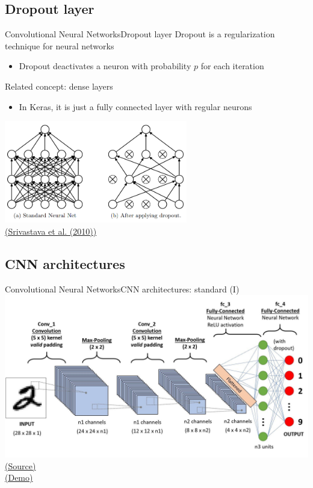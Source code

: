 \documentclass[10pt,compress]{beamer} %
\begin{document}
\subsection{Dropout layer}
\begin{frame}{Convolutional Neural Networks}{Dropout layer}
	\alert{Dropout} is a regularization technique for neural networks
	\begin{itemize}
		\item Dropout deactivates a neuron with probability $p$ for each iteration
	\end{itemize}

	Related concept: \alert{dense layers}
	\begin{itemize}
		\item In Keras, it is just a fully connected layer with regular neurons
	\end{itemize}
	\centering
        \includegraphics[width=0.6\textwidth]{figs/dropout.png}\\
	\scriptsize\href{https://jmlr.org/papers/volume15/srivastava14a.old/srivastava14a.pdf}{(Srivastava et al. (2010))}
\end{frame}

\subsection{CNN architectures}
\begin{frame}{Convolutional Neural Networks}{CNN architectures: standard (I)}
	\centering
        \includegraphics[width=\textwidth]{figs/layers.png}\\
	    \scriptsize\href{https://towardsdatascience.com/a-comprehensive-guide-to-convolutional-neural-networks-the-eli5-way-3bd2b1164a53}{(Source)}\\

	\normalsize \href{https://poloclub.github.io/cnn-explainer/}{(Demo)}
\end{frame}
\end{document}

